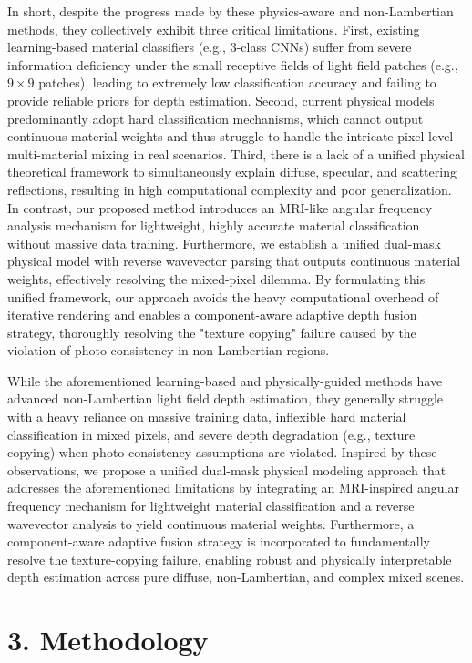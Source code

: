 \documentclass[lettersize,journal]{IEEEtran}
\begin{document}
In short, despite the progress made by these physics-aware and non-Lambertian methods, they collectively exhibit three critical limitations. First, existing learning-based material classifiers (e.g., 3-class CNNs) suffer from severe information deficiency under the small receptive fields of light field patches (e.g., $9 \times 9$ patches), leading to extremely low classification accuracy and failing to provide reliable priors for depth estimation. Second, current physical models predominantly adopt hard classification mechanisms, which cannot output continuous material weights and thus struggle to handle the intricate pixel-level multi-material mixing in real scenarios. Third, there is a lack of a unified physical theoretical framework to simultaneously explain diffuse, specular, and scattering reflections, resulting in high computational complexity and poor generalization. In contrast, our proposed method introduces an MRI-like angular frequency analysis mechanism for lightweight, highly accurate material classification without massive data training. Furthermore, we establish a unified dual-mask physical model with reverse wavevector parsing that outputs continuous material weights, effectively resolving the mixed-pixel dilemma. By formulating this unified framework, our approach avoids the heavy computational overhead of iterative rendering and enables a component-aware adaptive depth fusion strategy, thoroughly resolving the "texture copying" failure caused by the violation of photo-consistency in non-Lambertian regions.

While the aforementioned learning-based and physically-guided methods have advanced non-Lambertian light field depth estimation, they generally struggle with a heavy reliance on massive training data, inflexible hard material classification in mixed pixels, and severe depth degradation (e.g., texture copying) when photo-consistency assumptions are violated. Inspired by these observations, we propose a unified dual-mask physical modeling approach that addresses the aforementioned limitations by integrating an MRI-inspired angular frequency mechanism for lightweight material classification and a reverse wavevector analysis to yield continuous material weights. Furthermore, a component-aware adaptive fusion strategy is incorporated to fundamentally resolve the texture-copying failure, enabling robust and physically interpretable depth estimation across pure diffuse, non-Lambertian, and complex mixed scenes.

\section{3. Methodology}
\end{document}
